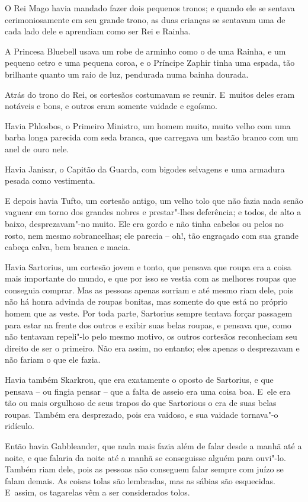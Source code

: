 O Rei Mago havia mandado fazer dois pequenos tronos; e quando ele se
sentava cerimoniosamente em seu grande trono, as duas crianças se
sentavam uma de cada lado dele e aprendiam como ser Rei e Rainha.

A Princesa Bluebell usava um robe de arminho como o de uma Rainha, e um
pequeno cetro e uma pequena coroa, e o Príncipe Zaphir tinha uma espada,
tão brilhante quanto um raio de luz, pendurada numa bainha dourada.

Atrás do trono do Rei, os cortesãos costumavam se reunir. E~muitos deles
eram notáveis e bons, e outros eram somente vaidade e egoísmo.

Havia Phlosbos, o Primeiro Ministro, um homem muito, muito velho com uma
barba longa parecida com seda branca, que carregava um bastão branco com
um anel de ouro nele.

Havia Janisar, o Capitão da Guarda, com bigodes selvagens e uma armadura
pesada como vestimenta.

E depois havia Tufto, um cortesão antigo, um velho tolo que não fazia
nada senão vaguear em torno dos grandes nobres e prestar"-lhes
deferência; e todos, de alto a baixo, desprezavam"-no muito. Ele era
gordo e não tinha cabelos ou pelos no rosto, nem mesmo sobrancelhas; ele
parecia -- oh!, tão engraçado com sua grande cabeça calva, bem branca e
macia.

Havia Sartorius, um cortesão jovem e tonto, que pensava que roupa era a
coisa mais importante do mundo, e que por isso se vestia com as melhores
roupas que conseguia comprar. Mas as pessoas apenas sorriam e até mesmo
riam dele, pois não há honra advinda de roupas bonitas, mas somente do
que está no próprio homem que as veste. Por toda parte, Sartorius sempre
tentava forçar passagem para estar na frente dos outros e exibir suas
belas roupas, e pensava que, como não tentavam repeli"-lo pelo mesmo
motivo, os outros cortesãos reconheciam seu direito de ser o primeiro.
Não era assim, no entanto; eles apenas o desprezavam e não fariam o que
ele fazia.

Havia também Skarkrou, que era exatamente o oposto de Sartorius, e que
pensava -- ou fingia pensar -- que a falta de asseio era uma coisa boa.
E~ele era tão ou mais orgulhoso de seus trapos do que Sartorious o era
de suas belas roupas. Também era desprezado, pois era vaidoso, e sua
vaidade tornava"-o ridículo.

Então havia Gabbleander, que nada mais fazia além de falar desde a manhã
até a noite, e que falaria da noite até a manhã se conseguisse alguém
para ouvi"-lo. Também riam dele, pois as pessoas não conseguem falar
sempre com juízo se falam demais. As coisas tolas são lembradas, mas as
sábias são esquecidas. E~assim, os tagarelas vêm a ser considerados
tolos.

